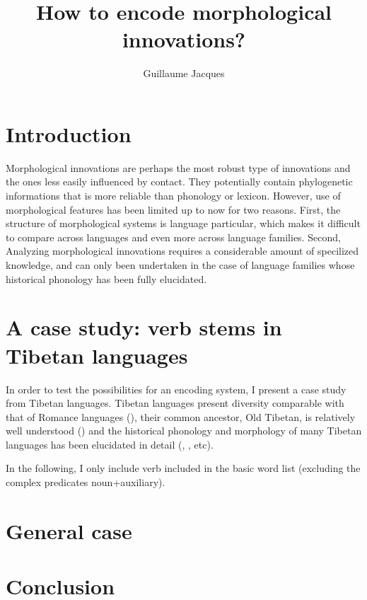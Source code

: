 \documentclass[oldfontcommands,oneside,a4paper,11pt]{article}
\begin{document}
 
 \title{How to encode morphological innovations?}
 \author{Guillaume Jacques}
 \maketitle 

\section{Introduction}
Morphological innovations are perhaps the most robust type of innovations and the ones less easily influenced by contact. They potentially contain phylogenetic informations that is more reliable than phonology or lexicon. However, use of morphological features has been limited up to now for two reasons. First, the structure of morphological systems is language particular, which makes it difficult to compare across languages and even more across language families. Second, Analyzing morphological innovations requires a considerable amount of specilized knowledge, and can only been undertaken in the case of language families whose historical phonology has been fully elucidated.



\section{A case study: verb stems in Tibetan languages}
In order to test the possibilities for an encoding system, I present a case study from Tibetan languages. Tibetan languages present diversity comparable with that of Romance languages (\citealt{tournadre05aire}), their common ancestor, Old Tibetan, is relatively well understood (\citealt{hill10synchronic}) and the historical phonology and morphology of many Tibetan languages has been elucidated in detail (\citealt{sun86ndzorge}, \citealt{jackson03zhongu}, \citealt{jacques14cone} etc).


In the following, I only include verb included in the basic word list (excluding the complex predicates noun+auxiliary).



\section{General case}

\section{Conclusion}



\end{document}
